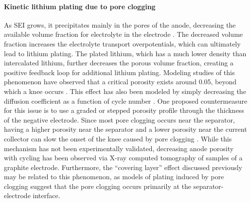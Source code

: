 \documentclass[journal=jpcl, manuscript=article, layout=onecolumn]{achemso}
\begin{document}
\paragraph{Kinetic lithium plating due to pore clogging}
As SEI grows, it precipitates mainly in the pores of the anode, decreasing the available volume fraction for electrolyte in the electrode \cite{sikha_effect_2004}. The decreased volume fraction increases the electrolyte transport overpotentials, which can ultimately lead to lithium plating. The plated lithium, which has a much lower density than intercalated lithium\cite{yang_modeling_2017}, further decreases the porous volume fraction, creating a positive feedback loop for additional lithium plating\cite{yang_modeling_2017}. Modeling studies of this phenomenon have observed that a critical porosity exists around 0.05, beyond which a knee occurs \cite{yang_modeling_2017, muller_model-based_2019}. This effect has also been modeled by simply decreasing the diffusion coefficient as a function of cycle number \cite{keil_electrochemical_2020}. One proposed countermeasure for this issue is to use a graded or stepped porosity profile through the thickness of the negative electrode. Since most pore clogging occurs near the separator, having a higher porosity near the separator and a lower porosity near the current collector can slow the onset of the knee caused by pore clogging \cite{muller_model-based_2019}.
While this mechanism has not been experimentally validated, decreasing anode porosity with cycling has been observed via X-ray computed tomography of samples of a graphite electrode.\cite{frisco_understanding_2016, rahe_nanoscale_2019} Furthermore, the ``covering layer'' effect discussed previously may be related to this phenomenon, as models of plating induced by pore clogging suggest that the pore clogging occurs primarily at the separator-electrode interface.\cite{yang_modeling_2017}
\end{document}
